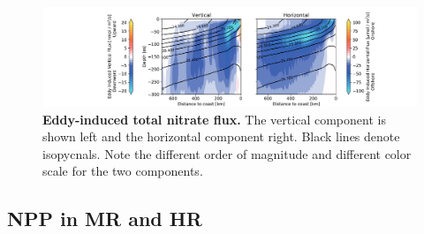 \begin{figure}
        \centering
        \includegraphics[width=17cm, trim=6.5cm 0 0 0]{../figures/result_eddy_quenching.pdf}
        \caption[Eddy-induced total nitrate flux]{\textbf{Eddy-induced total nitrate flux.} The vertical component is shown left and the horizontal component right. Black lines denote isopycnals. Note the different order of magnitude and different color scale for the two components.}\label{fig:gruber-n-flux}
\end{figure}

\subsection{NPP in MR and HR}\label{sec:npp-dist}


